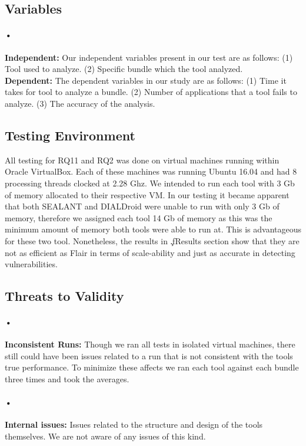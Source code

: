 \documentclass[twocolumn]{article}
\begin{document}
\subsection{Variables}
\paragraph{•}
	\textbf{Independent:} Our independent variables present in our test are as follows: (1) Tool used to analyze. (2) Specific bundle which the tool analyzed.\\
	\textbf{Dependent:} The dependent variables in our study are as follows: (1) Time it takes for tool to analyze a bundle. (2) Number of applications that a tool fails to analyze. (3) The accuracy of the analysis.
	
\subsection{Testing Environment}
	All testing for RQ11 and RQ2 was done on virtual machines running within Oracle VirtualBox. Each of these machines was running Ubuntu 16.04 and had 8 processing threads clocked at 2.28 Ghz. We intended to run each tool with 3 Gb of memory allocated to their respective VM. In our testing it became apparent that both SEALANT and DIALDroid were unable to run with only 3 Gb of memory, therefore we assigned each tool 14 Gb of memory as this was the minimum amount of memory both tools were able to run at. This is advantageous for these two tool. Nonetheless, the results in \c.f{Results section} show that they are not as efficient as Flair in terms of scale-ability and just as accurate in detecting vulnerabilities.
\subsection{Threats to Validity}
\paragraph{•}
	\textbf{Inconsistent Runs:} Though we ran all tests in isolated virtual machines, there still could have been issues related to a run that is not consistent with the tools true performance. To minimize these affects we ran each tool against each bundle three times and took the averages.
\paragraph{•}
	\textbf{Internal issues:} Issues related to the structure and design of the tools themselves. We are not aware of any issues of this kind.
\end{document}
